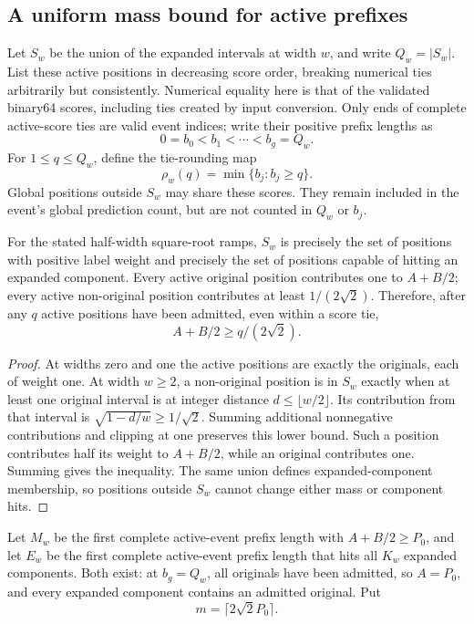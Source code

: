 \subsection{A uniform mass bound for active prefixes}
\label{sec:saturation-mass-bound}
Let $S_w$ be the union of the expanded intervals at width $w$, and write
$Q_w=|S_w|$. List these active positions in decreasing score order, breaking
numerical ties arbitrarily but consistently. Numerical equality here is
that of the validated binary64 scores, including ties created by input
conversion. Only ends of complete active-score ties are valid event indices;
write their positive prefix lengths as
\[
 0=b_0<b_1<\cdots<b_g=Q_w.
\]
For $1\le q\le Q_w$, define the tie-rounding map
\[
 \rho_w(q)=\min\{b_j:b_j\ge q\}.
\]
Global positions outside $S_w$ may share these scores. They remain included
in the event's global prediction count, but are not counted in $Q_w$ or $b_j$.

\begin{lemma}
For the stated half-width square-root ramps, $S_w$ is precisely the set of
positions with positive label weight and precisely the set of positions
capable of hitting an expanded component. Every active original position
contributes one to $A+B/2$; every active non-original position contributes
at least $1/(2\sqrt2)$. Therefore, after any $q$ active positions have been
admitted, even within a score tie,
\[
 A+B/2\ge q/(2\sqrt2).
\]
\end{lemma}
\begin{proof}
At widths zero and one the active positions are exactly the originals, each
of weight one. At width $w\ge2$, a non-original position is in $S_w$ exactly
when at least one original interval is at integer distance
$d\le\lfloor w/2\rfloor$. Its contribution from that interval is
$\sqrt{1-d/w}\ge1/\sqrt2$. Summing additional nonnegative contributions
and clipping at one preserves this lower bound. Such a position contributes
half its weight to $A+B/2$, while an original contributes one. Summing gives
the inequality. The same union defines expanded-component membership, so
positions outside $S_w$ cannot change either mass or component hits.
\end{proof}

Let $M_w$ be the first complete active-event prefix length with
$A+B/2\ge P_0$, and let $E_w$ be the first complete active-event prefix
length that hits all $K_w$ expanded components. Both exist: at $b_g=Q_w$,
all originals have been admitted, so $A=P_0$, and every expanded component
contains an admitted original. Put
\[
 m=\lceil2\sqrt2 P_0\rceil.
\]

